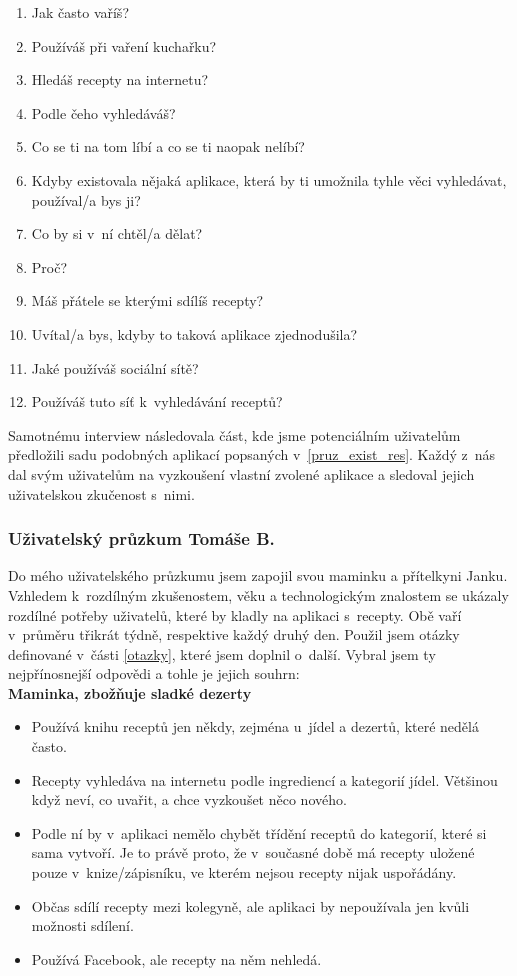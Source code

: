 \documentclass[a4paper, 11pt]{article}
\newcommand{\sss}[1]{\subsubsection{#1}} %
\begin{document}
    \begin{enumerate}[itemsep=0em, parsep=0em, label=\textbf{\arabic*)}]\label{otazky}
        \item Jak často vaříš?
        \item Používáš při vaření kuchařku?
        \item Hledáš recepty na internetu?
        \item Podle čeho vyhledáváš?
        \item Co se ti na tom líbí a co se ti naopak nelíbí?
        \item Kdyby existovala nějaká aplikace, která by ti umožnila tyhle věci vyhledávat, používal/a bys ji?
        \item Co by si v~ní chtěl/a dělat?
        \item Proč?
        \item Máš přátele se kterými sdílíš recepty?
        \item Uvítal/a bys, kdyby to taková aplikace zjednodušila?
        \item Jaké používáš sociální sítě?
        \item Používáš tuto síť k~vyhledávání receptů?
    \end{enumerate}

    Samotnému interview následovala  část, kde jsme potenciálním uživatelům
    předložili sadu podobných aplikací popsaných v~\ref{pruz_exist_res}. Každý z~nás dal svým
    uživatelům na vyzkoušení vlastní zvolené aplikace a sledoval jejich uživatelskou
    zkučenost s~nimi.

    \sss{Uživatelský průzkum Tomáše B.}

    Do mého uživatelského průzkumu jsem zapojil svou maminku a přítelkyni Janku. 
    Vzhledem k~rozdílným zku\-še\-no\-stem, věku a technologickým znalostem se ukázaly rozdílné potřeby uživatelů,
    které by kladly na aplikaci s~recepty.
    Obě vaří v~průměru třikrát týdně, respektive každý druhý den.
    Použil jsem otázky definované v~části \ref{otazky}, které jsem doplnil o~další. 
    Vybral jsem ty nejpřínosnejší odpovědi a tohle je jejich souhrn: \\

    \noindent\textbf{Maminka, zbožňuje sladké dezerty}
    \begin{itemize}
        \item Používá knihu receptů jen někdy, zejména u~jídel a dezertů, které nedělá často.
        \item Recepty vyhledáva na internetu podle ingrediencí a kategorií jídel. Většinou když neví,
        co uvařit, a chce vyzkoušet něco nového.
        \item Podle ní by v~aplikaci nemělo chybět třídění receptů do kategorií, které si sama vytvoří.
        Je to právě proto, že v~současné době má recepty uložené pouze v~knize/zápisníku,
        ve kterém nejsou recepty nijak uspořádány.
        \item Občas sdílí recepty mezi kolegyně, ale aplikaci by nepoužívala jen kvůli možnosti sdílení.
        \item Používá Facebook, ale recepty na něm nehledá.
    \end{itemize}
\end{document}
